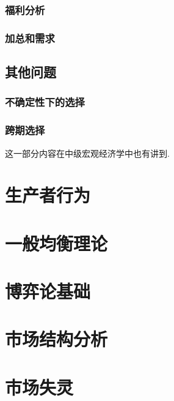 \documentclass[lang=cn,10pt]{elegantbook}
\begin{document}
\subsection{福利分析}
\newpage

\subsection{加总和需求}
\newpage

\section{其他问题}
\newpage

\subsection{不确定性下的选择}
\newpage

\subsection{跨期选择}
这一部分内容在中级宏观经济学中也有讲到.
\newpage

\chapter{生产者行为}
\chapter{一般均衡理论}
\chapter{博弈论基础}
\chapter{市场结构分析}
\chapter{市场失灵}
\end{document}
